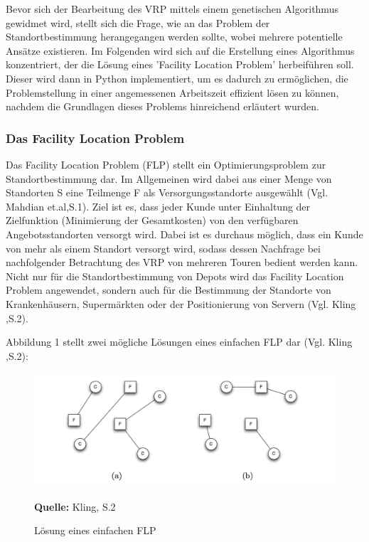\documentclass[a4paper,12pt,parskip,bibtotoc,liststotoc]{article}
\begin{document}
Bevor sich der Bearbeitung des VRP mittels einem genetischen Algorithmus gewidmet wird, stellt sich die Frage, wie an das Problem der Standortbestimmung herangegangen werden sollte, wobei mehrere potentielle Ansätze existieren.
Im Folgenden wird sich auf die Erstellung eines Algorithmus konzentriert, der die Lösung eines 'Facility Location Problem' herbeiführen soll.
Dieser wird dann in Python implementiert, um es dadurch zu ermöglichen, die Problemstellung in einer angemessenen Arbeitszeit effizient lösen zu können, nachdem die Grundlagen dieses Problems hinreichend erläutert wurden.


\subsubsection{Das Facility Location Problem}

Das Facility Location Problem (FLP) stellt ein Optimierungsproblem zur Standortbestimmung dar. Im Allgemeinen wird dabei aus einer Menge von Standorten S eine Teilmenge F als Versorgungsstandorte ausgewählt (Vgl. Mahdian et.al,S.1).
Ziel ist es, dass jeder Kunde unter Einhaltung der Zielfunktion (Minimierung der Gesamtkosten) von den verfügbaren Angebotsstandorten versorgt wird.
Dabei ist es durchaus möglich, dass ein Kunde von mehr als einem Standort versorgt wird, sodass dessen Nachfrage bei nachfolgender Betrachtung des VRP von mehreren Touren bedient werden kann.
Nicht nur für die Standortbestimmung von Depots wird das Facility Location Problem angewendet, sondern auch für die Bestimmung der Standorte von Krankenhäusern, Supermärkten oder der Positionierung von Servern (Vgl. Kling ,S.2).

Abbildung 1 stellt zwei mögliche Lösungen eines einfachen FLP dar (Vgl. Kling ,S.2):

\begin{figure}[h!]
  \begin{center}
    \includegraphics[width=150mm]{FLP}
    \caption{Lösung eines einfachen FLP}  \label{Typen}
    {\footnotesize \textbf{Quelle:} Kling, S.2 }
  \end{center}
\end{figure}
\end{document}
